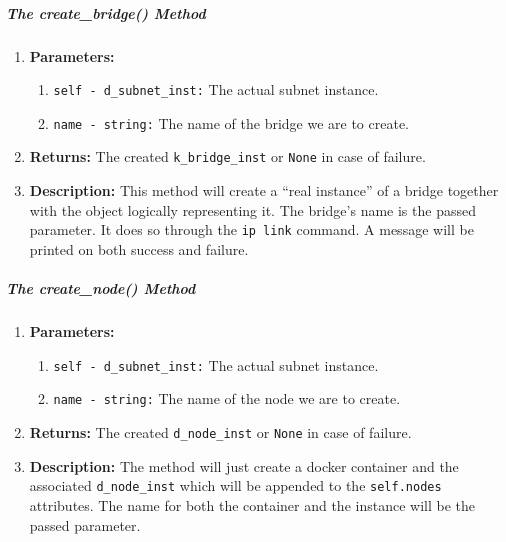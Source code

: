         \subparagraph{The create\_bridge() Method}
            \begin{enumerate}
                \item \textbf{Parameters:}
                \begin{enumerate}
                    \item \texttt{self - d\_subnet\_inst:} The actual subnet instance.
                    \item \texttt{name - string:} The name of the bridge we are to create.
                \end{enumerate}
                \item \textbf{Returns:} The created \texttt{k\_bridge\_inst} or \texttt{None} in case of failure.
                \item \textbf{Description:} This method will create a ``real instance'' of a bridge together with the object logically representing it. The bridge's name is the passed parameter. It does so through the \texttt{ip link} command. A message will be printed on both success and failure.
            \end{enumerate}

        \subparagraph{The create\_node() Method}
            \begin{enumerate}
                \item \textbf{Parameters:}
                \begin{enumerate}
                    \item \texttt{self - d\_subnet\_inst:} The actual subnet instance.
                    \item \texttt{name - string:} The name of the node we are to create.
                \end{enumerate}
                \item \textbf{Returns:} The created \texttt{d\_node\_inst} or \texttt{None} in case of failure.
                \item \textbf{Description:} The method will just create a docker container and the associated \texttt{d\_node\_inst} which will be appended to the \texttt{self.nodes} attributes. The name for both the container and the instance will be the passed parameter.
            \end{enumerate}

